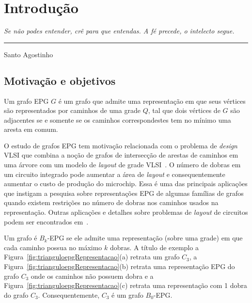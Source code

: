 \chapter{Introdução}

\begin{flushright}
\begin{minipage}[t][0cm][b]{0.47\textwidth}
\emph{Se não podes entender, crê para que entendas. A fé precede, o intelecto segue.}
\end{minipage}

\rule[0cm]{7cm}{0.03cm}%

Santo Agostinho
\end{flushright}


\section{Motivação e objetivos}

Um grafo EPG $G$ é um grafo que admite uma representação em que seus vértices são representados por caminhos de uma grade $Q$, tal que dois vértices de $G$ são adjacentes se e somente se os caminhos correspondestes tem no mínimo uma aresta em comum.

O estudo de grafos EPG tem motivação relacionada com o problema de \textit{design} VLSI que combina a noção de grafos de intersecção de arestas de caminhos em uma árvore com um modelo de \textit{layout} de grade VLSI~\cite{golumbic2009}. O número de dobras em um circuito integrado pode aumentar a área de \textit{layout} e consequentemente aumentar o custo de produção do microchip. 
Essa é uma das principais aplicações que instigam a  pesquisa sobre representações EPG de algumas famílias de grafos quando existem restrições no número de dobras nos caminhos usados na representação.
Outras aplicações e detalhes sobre problemas de \textit{layout} de circuitos podem ser encontrados em~\cite{bandy1990, molitor1991}.   

Um grafo é $ B_k$-EPG se ele admite uma representação (sobre uma grade) em que cada caminho possua no máximo $k$ dobras. A título de exemplo a Figura~\ref{fig:trianguloepgRepresentacao}(a) retrata um grafo $C_3$, a Figura~\ref{fig:trianguloepgRepresentacao}(b) retrata uma representação EPG do grafo $C_3$ onde os caminhos não possuem dobra e a  Figura~\ref{fig:trianguloepgRepresentacao}(c) retrata uma representação com 1 dobra do grafo $C_3$. Consequentemente, $C_3$ é um grafo  $B_0$-EPG. %

